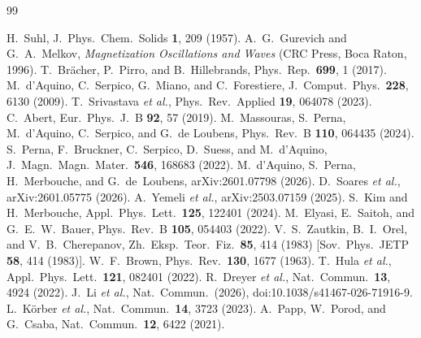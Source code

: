 \documentclass[aps,prb,reprint,superscriptaddress,floatfix]{revtex4-2}
\begin{document}
\begin{thebibliography}{99}

 H.~Suhl, J.~Phys.\ Chem.\ Solids \textbf{1}, 209 (1957).
 A.~G.~Gurevich and G.~A.~Melkov, \textit{Magnetization Oscillations and Waves} (CRC Press, Boca Raton, 1996).
 T.~Br\"acher, P.~Pirro, and B.~Hillebrands, Phys.\ Rep.\ \textbf{699}, 1 (2017).
 M.~d'Aquino, C.~Serpico, G.~Miano, and C.~Forestiere, J.~Comput.\ Phys.\ \textbf{228}, 6130 (2009).
 T.~Srivastava \textit{et al.}, Phys.\ Rev.\ Applied \textbf{19}, 064078 (2023).
 C.~Abert, Eur.\ Phys.\ J.~B \textbf{92}, 57 (2019).
 M.~Massouras, S.~Perna, M.~d'Aquino, C.~Serpico, and G.~de Loubens, Phys.\ Rev.\ B \textbf{110}, 064435 (2024).
 S.~Perna, F.~Bruckner, C.~Serpico, D.~Suess, and M.~d'Aquino, J.~Magn.\ Magn.\ Mater.\ \textbf{546}, 168683 (2022).
 M.~d'Aquino, S.~Perna, H.~Merbouche, and G.~de~Loubens, arXiv:2601.07798 (2026).
 D.~Soares \textit{et al.}, arXiv:2601.05775 (2026).
 A.~Yemeli \textit{et al.}, arXiv:2503.07159 (2025).
 S.~Kim and H.~Merbouche, Appl.\ Phys.\ Lett.\ \textbf{125}, 122401 (2024).
 M.~Elyasi, E.~Saitoh, and G.~E.~W.~Bauer, Phys.\ Rev.\ B \textbf{105}, 054403 (2022).
 V.~S.~Zautkin, B.~I.~Orel, and V.~B.~Cherepanov, Zh.\ Eksp.\ Teor.\ Fiz.\ \textbf{85}, 414 (1983) [Sov.\ Phys.\ JETP \textbf{58}, 414 (1983)].
 W.~F.~Brown, Phys.\ Rev.\ \textbf{130}, 1677 (1963).
 T.~Hula \textit{et al.}, Appl.\ Phys.\ Lett.\ \textbf{121}, 082401 (2022).
 R.~Dreyer \textit{et al.}, Nat.\ Commun.\ \textbf{13}, 4924 (2022).
 J.~Li \textit{et al.}, Nat.\ Commun.\ (2026), doi:10.1038/s41467-026-71916-9.
 L.~K\"orber \textit{et al.}, Nat.\ Commun.\ \textbf{14}, 3723 (2023).
 A.~Papp, W.~Porod, and G.~Csaba, Nat.\ Commun.\ \textbf{12}, 6422 (2021).

\end{thebibliography}
\end{document}
